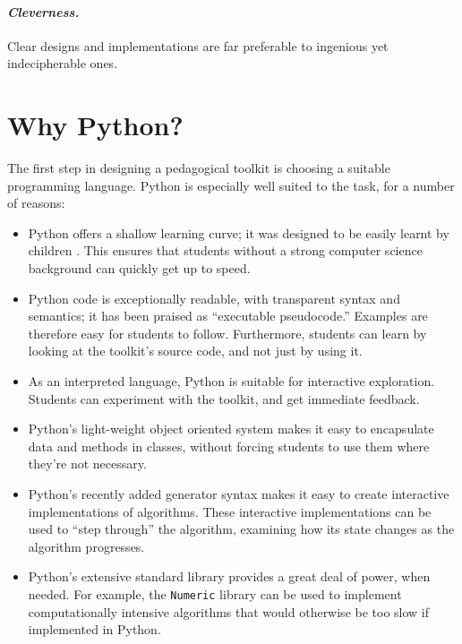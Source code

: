 \documentclass{article}
\begin{document}
\paragraph{\textit{Cleverness.}} Clear designs and implementations are
far preferable to ingenious yet indecipherable ones.

\section{Why Python?}

The first step in designing a pedagogical toolkit is choosing a
suitable programming language.  Python is especially well suited to
the task, for a number of reasons:

\begin{itemize}
\item Python offers a shallow learning curve; it was designed to be
  easily learnt by children \cite{cp4e}.  This ensures that students
  without a strong computer science background can quickly get up to
  speed.
  
\item Python code is exceptionally readable, with transparent syntax
  and semantics; it has been praised as ``executable pseudocode.''
  Examples are therefore easy for students to follow.  Furthermore,
  students can learn by looking at the toolkit's source code, and not
  just by using it.
  
\item As an interpreted language, Python is suitable for interactive
  exploration.  Students can experiment with the toolkit, and get
  immediate feedback.
  
\item Python's light-weight object oriented system makes it easy to
  encapsulate data and methods in classes, without forcing students to
  use them where they're not necessary.
  
\item Python's recently added generator syntax makes it easy to create
  interactive implementations of algorithms.  These interactive
  implementations can be used to ``step through'' the algorithm,
  examining how its state changes as the algorithm progresses.
  
\item Python's extensive standard library provides a great deal of
  power, when needed.  For example, the \texttt{Numeric} library can
  be used to implement computationally intensive algorithms that would
  otherwise be too slow if implemented in Python.
\end{itemize}
\end{document}
